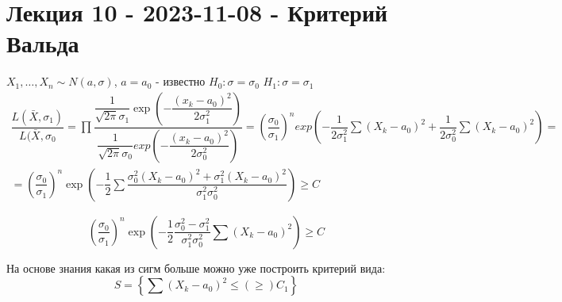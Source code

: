 \section{Лекция 10 - 2023-11-08 - Критерий Вальда}




  

\begin{ex}
  $X_1,\dots,X_n \sim N(a, \sigma)$, $a = a_0$ - известно
  $H_0 : \sigma = \sigma_0$
  $H_1 : \sigma = \sigma_1$
  \begin{multline*}
    \dfrac{L(\bar X, \sigma_1)}{L(\bar X, \sigma_0}
    = \prod \dfrac{\dfrac{1}{\sqrt{2\pi} \sigma_1} \exp\left(- \dfrac{(x_k - a_0)^2}{2\sigma_1^2}\right)}{\dfrac{1}{\sqrt{2\pi} \sigma_0} exp\left(- \dfrac{(x_k - a_0)^2}{2\sigma_0^2}\right)}
    = \left(\dfrac{\sigma_0}{\sigma_1}\right)^n exp\left(-\dfrac{1}{2\sigma_1^2} \sum (X_k-a_0)^2 + \dfrac{1}{2\sigma_0^2} \sum (X_k-a_0)^2 \right) = \\
    = \left(\dfrac{\sigma_0}{\sigma_1}\right)^n \exp\left( -\dfrac{1}{2} \sum \dfrac{\sigma_0^2 (X_k-a_0)^2 + \sigma_1^2 (X_k - a_0)^2}{\sigma_1^2 \sigma_0^2} \right) \geqslant C
  \end{multline*}

  \begin{equation*}
    \left(\dfrac{\sigma_0}{\sigma_1}\right)^n \exp\left(-\dfrac{1}{2} \dfrac{\sigma_0^2 - \sigma_1^2}{\sigma_1^2 \sigma_0^2} \sum (X_k-a_0)^2\right) \geqslant C
  \end{equation*}

  На основе знания какая из сигм больше можно уже построить критерий вида:
  $$ S = \left\{ \sum(X_k-a_0)^2 \leqslant (\geqslant) C_1 \right\} $$
\end{ex}

